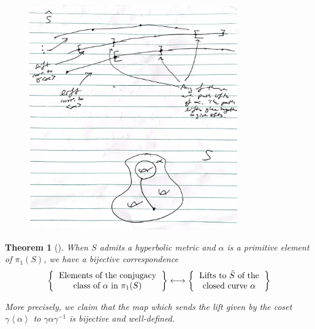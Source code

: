 \documentclass[reqno]{amsart}
\newtheorem{theorem}{Theorem}[section]
\theoremstyle{definition}
\theoremstyle{remark}
\begin{document}
 \begin{figure}[http]
     \centering
     \includegraphics[width=0.8\textwidth]{lifts-of-paths.jpg}
     \caption{}
     \label{fig:lifts-of-paths}
 \end{figure}


 \begin{theorem}[]
When $S$ admits a hyperbolic metric and
$\alpha$ is a primitive element of $\pi_1 (S)$, we have
a bijective correspondence
\[
\left\{ 
    \begin{tabular}{c}
    Elements of the conjugacy\\
    class of $\alpha$ in $\pi_1 (S)$
\end{tabular}
\right\} 
\longleftrightarrow
\left\{ 
    \begin{tabular}{c}
    Lifts to $\tilde{S}$ of the\\
    closed curve $\alpha$
\end{tabular}
\right\} 
\] 


More precisely, we claim that the map which sends the lift
given by the coset $\gamma \left<\alpha \right>$ to
$\gamma \alpha \gamma^{-1}$ is bijective and well-defined.\\
 \end{theorem}

\end{document}
